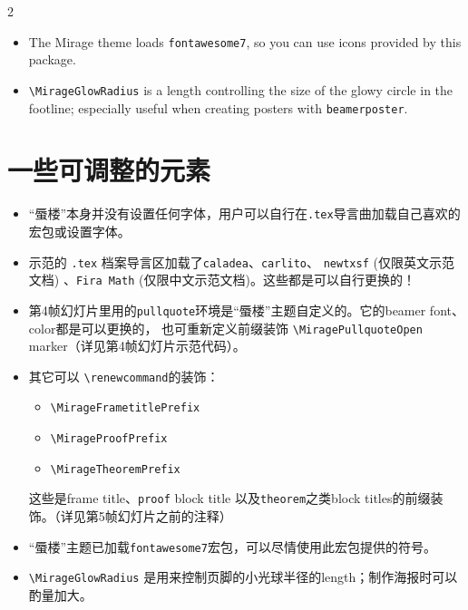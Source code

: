 \documentclass{article}
\begin{document}
\begin{paracol}{2}
\begin{itemize}
\item The Mirage theme loads \texttt{fontawesome7}, so you can use
icons provided by this package.

\item \verb|\MirageGlowRadius| is a length controlling the size of the glowy circle in the footline; especially useful when creating posters with \texttt{beamerposter}.
\end{itemize}

\switchcolumn

\section{一些可调整的元素}
\begin{itemize}
\item “蜃楼”本身并没有设置任何字体，用户可以自行在\texttt{.tex}导言曲加载自己喜欢的宏包或设置字体。

\item  示范的 \texttt{.tex} 档案导言区加载了\texttt{caladea}、\texttt{carlito}、 \texttt{newtxsf} (仅限英文示范文档) 、\texttt{Fira Math} (仅限中文示范文档)。这些都是可以自行更换的！

\item 第4帧幻灯片里用的\texttt{pullquote}环境是“蜃楼”主题自定义的。它的beamer font、color都是可以更换的， 也可重新定义前缀装饰 \verb|\MiragePullquoteOpen| marker（详见第4帧幻灯片示范代码）。

\item  其它可以 \verb|\renewcommand|的装饰：
\begin{itemize}[nosep]
    \item \verb|\MirageFrametitlePrefix|
    \item \verb|\MirageProofPrefix|
    \item \verb|\MirageTheoremPrefix| 
\end{itemize} 
这些是frame title、\texttt{proof} block title 以及\texttt{theorem}之类block titles的前缀装饰。（详见第5帧幻灯片之前的注释）

\item “蜃楼”主题已加载\texttt{fontawesome7}宏包，可以尽情使用此宏包提供的符号。

\item \verb|\MirageGlowRadius| 是用来控制页脚的小光球半径的length；制作海报时可以酌量加大。
\end{itemize}

\end{paracol}
\end{document}
